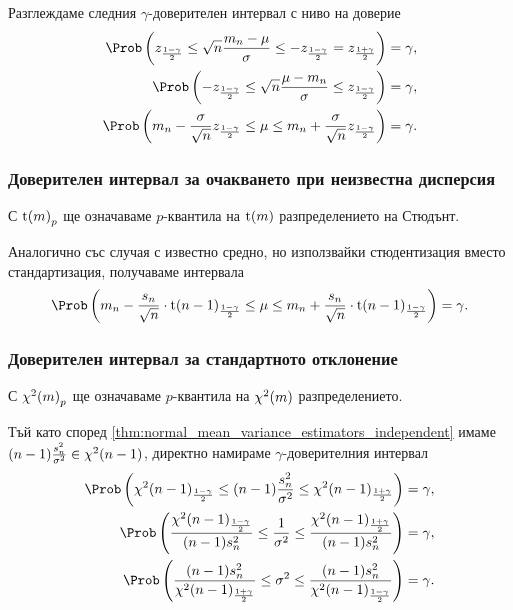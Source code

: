 \documentclass[
  numbers=endperiod,
  headings=standardclasses,
  bibliography=totocnumbered,
]{scrartcl}
\begin{document}
Разглеждаме следния \( \gamma \)-доверителен интервал с ниво на доверие
\begin{align*}
  \Prob \left( z_{\frac {1-\gamma} 2} \leq \sqrt n \frac {m_n - \mu} \sigma \leq -z_{\frac {1-\gamma} 2} = z_{\frac {1+\gamma} 2} \right) &= \gamma,
  \\
  \Prob \left( -z_{\frac {1-\gamma} 2} \leq \sqrt n \frac {\mu - m_n} \sigma \leq z_{\frac {1-\gamma} 2} \right) &= \gamma,
  \\
  \Prob \left( m_n - \frac \sigma {\sqrt n} z_{\frac {1-\gamma} 2} \leq \mu \leq m_n + \frac \sigma {\sqrt n} z_{\frac {1-\gamma} 2} \right) &= \gamma.
\end{align*}

\subsubsection{Доверителен интервал за очакването при неизвестна дисперсия}

С \( {\operatorname{t}(m)}_p \) ще означаваме \( p \)-квантила на \( \operatorname{t}(m) \) разпределението на Стюдънт.

Аналогично със случая с известно средно, но използвайки стюдентизация вместо стандартизация, получаваме интервала
\begin{equation*}
  \Prob \left( m_n - \frac {s_n} {\sqrt n} \cdot {\DStudent(n-1)}_{\frac {1-\gamma} 2} \leq \mu \leq m_n + \frac {s_n} {\sqrt n} \cdot {\DStudent(n-1)}_{\frac {1-\gamma} 2} \right) = \gamma.
\end{equation*}

\subsubsection{Доверителен интервал за стандартното отклонение}

С \( {\chi^2(m)}_p \) ще означаваме \( p \)-квантила на \( \chi^2(m) \) разпределението.

Тъй като според \cref{thm:normal_mean_variance_estimators_independent} имаме \( (n-1) \frac {s_n^2} {\sigma^2} \in \chi^2(n-1) \), директно намираме \( \gamma \)-доверителния интервал
\begin{align*}
  \Prob \left( {\DChiSq(n-1)}_{\frac {1-\gamma} 2} \leq (n-1) \frac {s_n^2} {\sigma^2} \leq {\DChiSq(n-1)}_{\frac {1+\gamma} 2} \right) &= \gamma,
  \\
  \Prob \left( \frac {{\DChiSq(n-1)}_{\frac {1-\gamma} 2}} {(n-1) s_n^2} \leq \frac 1 {\sigma^2} \leq \frac {{\DChiSq(n-1)}_{\frac {1+\gamma} 2}} {(n-1) s_n^2} \right) &= \gamma,
  \\
  \Prob \left( \frac {(n-1) s_n^2} {{\DChiSq(n-1)}_{\frac {1+\gamma} 2}} \leq \sigma^2 \leq \frac {(n-1) s_n^2} {{\DChiSq(n-1)}_{\frac {1-\gamma} 2}} \right) &= \gamma.
\end{align*}

\printbibliography
\end{document}
